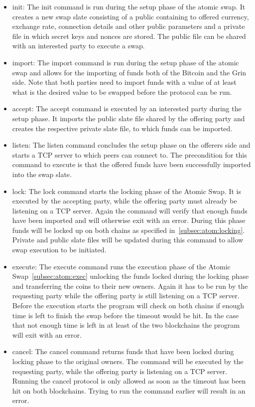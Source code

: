 \begin{itemize}
    \item init: The init command is run during the setup phase of the atomic swap.
    It creates a new swap slate consisting of a public containing to offered currency, exchange rate, connection details and other public parameters and a private file in which secret keys and nonces are stored.
    The public file can be shared with an interested party to execute a swap.
    \item import: The import command is run during the setup phase of the atomic swap and allows for the importing of funds both of the Bitcoin and the Grin side.
    Note that both parties need to import funds with a value of at least what is the desired value to be swapped before the protocol can be run.
    \item accept: The accept command is executed by an interested party during the setup phase.
    It imports the public slate file shared by the offering party and creates the respective private slate file, to which funds can be imported.
    \item listen: The listen command concludes the setup phase on the offerers side and starts a TCP server to which peers can connect to.
    The precondition for this command to execute is that the offered funds have been successfully imported into the swap slate.
    \item lock: The lock command starts the locking phase of the Atomic Swap.
    It is executed by the accepting party, while the offering party must already be listening on a TCP server.
    Again the command will verify that enough funds have been imported and will otherwise exit with an error.
    During this phase funds will be locked up on both chains as specified in~\cref{subsec:atom:locking}.
    Private and public slate files will be updated during this command to allow swap execution to be initiated.
    \item execute: The execute command runs the execution phase of the Atomic Swap~\cref{subsec:atom:exec} unlocking the funds locked during the locking phase and transferring the coins to their new owners.
    Again it has to be run by the requesting party while the offering party is still listening on a TCP server.
    Before the execution starts the program will check on both chains if enough time is left to finish the swap before the timeout would be hit.
    In the case that not enough time is left in at least of the two blockchains the program will exit with an error.
    \item cancel: The cancel command returns funds that have been locked during locking phase to the original owners.
    The command will be executed by the requesting party, while the offering party is listening on a TCP server.
    Running the cancel protocol is only allowed as soon as the timeout has been hit on both blockchains.
    Trying to run the command earlier will result in an error.
\end{itemize}

